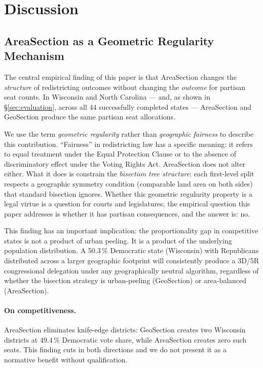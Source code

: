 \section{Discussion}
\label{sec:discussion}

\subsection{AreaSection as a Geometric Regularity Mechanism}

The central empirical finding of this paper is that AreaSection changes the
\emph{structure} of redistricting outcomes without changing the \emph{outcome}
for partisan seat counts.
In Wisconsin and North Carolina --- and, as shown in \S\ref{sec:evaluation},
across all 44 successfully completed states --- AreaSection and GeoSection
produce the same partisan seat allocations.

We use the term \emph{geometric regularity} rather than \emph{geographic
fairness} to describe this contribution.
``Fairness'' in redistricting law has a specific meaning: it refers to equal
treatment under the Equal Protection Clause or to the absence of discriminatory
effect under the Voting Rights Act.
AreaSection does not alter either.
What it does is constrain the \emph{bisection tree structure}: each first-level
split respects a geographic symmetry condition (comparable land area on both
sides) that standard bisection ignores.
Whether this geometric regularity property is a legal virtue is a question for
courts and legislatures; the empirical question this paper addresses is whether
it has partisan consequences, and the answer is: no.

This finding has an important implication: the proportionality gap in competitive
states is not a product of urban peeling.
It is a product of the underlying population distribution.
A 50.3\,\% Democratic state (Wisconsin) with Republicans distributed across
a larger geographic footprint will consistently produce a 3D/5R congressional
delegation under any geographically neutral algorithm, regardless of whether
the bisection strategy is urban-peeling (GeoSection) or area-balanced
(AreaSection).

\paragraph{On competitiveness.}
AreaSection eliminates knife-edge districts: GeoSection creates two Wisconsin
districts at 49.4\,\% Democratic vote share, while AreaSection creates zero
such seats.
This finding cuts in both directions and we do not present it as a normative
benefit without qualification.

